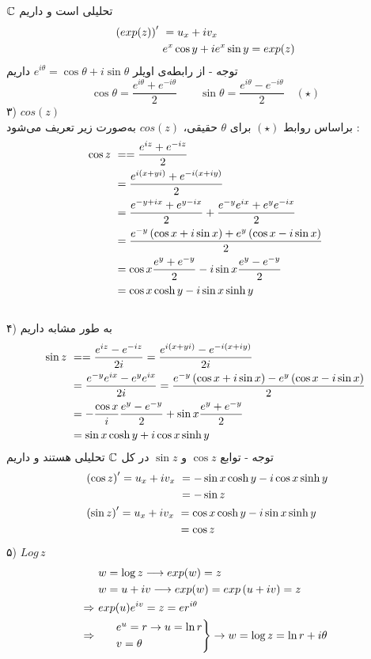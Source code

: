 $\mathbb{C}$
تحلیلی است و داریم
\[\begin{aligned}
	\left(exp(z)\right)^\prime&\ =u_x+iv_x
	\\ &\
	e^x\cos y+ie^x\sin y=exp(z)
\end{aligned}\]
توجه - از رابطه‌ی اویلر
$e^{i\theta}=\cos\theta+i\sin\theta$
داریم
\[
\cos\theta=\frac{e^{i\theta}+e^{-i\theta}}2\qquad
\sin\theta=\frac{e^{i\theta}-e^{-i\theta}}2
\quad (\star)
\]
۳)
$cos(z)$\\
براساس روابط
$(\star)$
برای
$\theta$
حقیقی،
$cos(z)$
به‌صورت زیر تعریف می‌شود :
\[\begin{aligned}
	\cos z&\ =
	=\frac{e^{iz}+e^{-iz}}2
	\\ &\
	=\frac{e^{i\left(x+yi\right)}+e^{-i\left(x+iy\right)}}2
	\\ &\
	=\frac{e^{-y+ix}+e^{y-ix}}2+\frac{e^{-y}e^{ix}+e^ye^{-ix}}2
	\\ &\
	=\frac{e^{-y}\left(\cos x+i\sin x\right)+e^y\left(\cos x-i\sin x\right)}2
	\\ &\
	=\cos x\frac{e^y+e^{-y}}2-i\sin x\frac{e^y-e^{-y}}2
	\\ &\
	=\cos x\cosh y-i\sin x\sinh y
\end{aligned}\]
\\
۴) به طور مشابه داریم
\[\begin{aligned}
	\sin z&\ =
	=\frac{e^{iz}-e^{-iz}}{2i}
	=\frac{e^{i\left(x+yi\right)}-e^{-i\left(x+iy\right)}}{2i}
	\\ &\
	=\frac{e^{-y}e^{ix}-e^ye^{ix}}{2i}
	=\frac{e^{-y}\left(\cos x+i\sin x\right)-e^y\left(\cos x-i\sin x\right)}2
	\\ &\
	=-\frac{\cos x}i\frac{e^y-e^{-y}}2+\sin x\frac{e^y+e^{-y}}2
	\\ &\
	=\sin x\cosh y+i\cos x\sinh y
\end{aligned}\]
توجه - توابع
$\cos z$
و
$\sin z$
در کل
$\mathbb{C}$
تحلیلی هستند و داریم
\[\begin{aligned}
	&\
	\begin{aligned}
		\left(\cos z\right)^\prime=u_x+iv_x &\ =
		-\sin x\cosh y-i\cos x\sinh y
		\\ &\
		=-\sin z
	\end{aligned}
	\\ &\
	\begin{aligned}
	\left(\sin z\right)^\prime=u_x+iv_x &\ =
	\cos x\cosh y-i\sin x\sinh y
	\\ &\
	=\cos z
\end{aligned}
\end{aligned}\]
۵)
$Log\,z$
\[\begin{aligned}
	&\ w=\log z\longrightarrow exp(w)=z
	\\ &\
	w=u+iv\longrightarrow exp(w)=exp\left(u+iv\right)=z
	\\ \Rightarrow&\
	 exp(u)e^{iv}=z=er^{i\theta}
	\\ \Rightarrow&\
	\begin{rcases}
		&\ e^u=r\rightarrow u=\ln r
		\\
		&\ v=\theta
	\end{rcases}\rightarrow
w=\log z=\ln r+i\theta
\end{aligned}\]
